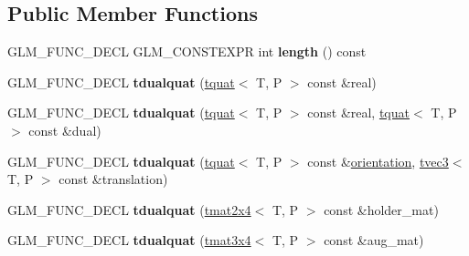 \subsection*{Public Member Functions}
\begin{DoxyCompactItemize}
\item 
\hypertarget{structglm_1_1detail_1_1tdualquat_a002ccdb011d5b6e79f613388e83f3f43}{G\-L\-M\-\_\-\-F\-U\-N\-C\-\_\-\-D\-E\-C\-L G\-L\-M\-\_\-\-C\-O\-N\-S\-T\-E\-X\-P\-R int {\bfseries length} () const }\label{structglm_1_1detail_1_1tdualquat_a002ccdb011d5b6e79f613388e83f3f43}

\item 
\hypertarget{structglm_1_1detail_1_1tdualquat_a4a3b8676710dc0dd69e03b7e5fa2fd46}{G\-L\-M\-\_\-\-F\-U\-N\-C\-\_\-\-D\-E\-C\-L {\bfseries tdualquat} (\hyperlink{structglm_1_1detail_1_1tquat}{tquat}$<$ T, P $>$ const \&real)}\label{structglm_1_1detail_1_1tdualquat_a4a3b8676710dc0dd69e03b7e5fa2fd46}

\item 
\hypertarget{structglm_1_1detail_1_1tdualquat_a3ba0cb0502e788715bd1b28547faaf78}{G\-L\-M\-\_\-\-F\-U\-N\-C\-\_\-\-D\-E\-C\-L {\bfseries tdualquat} (\hyperlink{structglm_1_1detail_1_1tquat}{tquat}$<$ T, P $>$ const \&real, \hyperlink{structglm_1_1detail_1_1tquat}{tquat}$<$ T, P $>$ const \&dual)}\label{structglm_1_1detail_1_1tdualquat_a3ba0cb0502e788715bd1b28547faaf78}

\item 
\hypertarget{structglm_1_1detail_1_1tdualquat_abf6379e6f03b8fd76ae490434893286a}{G\-L\-M\-\_\-\-F\-U\-N\-C\-\_\-\-D\-E\-C\-L {\bfseries tdualquat} (\hyperlink{structglm_1_1detail_1_1tquat}{tquat}$<$ T, P $>$ const \&\hyperlink{group__gtx__rotate__vector_gac80aaf3b2af70c7f03f1077d4b6ac507}{orientation}, \hyperlink{structglm_1_1detail_1_1tvec3}{tvec3}$<$ T, P $>$ const \&translation)}\label{structglm_1_1detail_1_1tdualquat_abf6379e6f03b8fd76ae490434893286a}

\item 
\hypertarget{structglm_1_1detail_1_1tdualquat_a07db5c65293e34b2d0e53c62940db0f8}{G\-L\-M\-\_\-\-F\-U\-N\-C\-\_\-\-D\-E\-C\-L {\bfseries tdualquat} (\hyperlink{structglm_1_1detail_1_1tmat2x4}{tmat2x4}$<$ T, P $>$ const \&holder\-\_\-mat)}\label{structglm_1_1detail_1_1tdualquat_a07db5c65293e34b2d0e53c62940db0f8}

\item 
\hypertarget{structglm_1_1detail_1_1tdualquat_afd1ddf2aeffe1f900dfbc17507860e89}{G\-L\-M\-\_\-\-F\-U\-N\-C\-\_\-\-D\-E\-C\-L {\bfseries tdualquat} (\hyperlink{structglm_1_1detail_1_1tmat3x4}{tmat3x4}$<$ T, P $>$ const \&aug\-\_\-mat)}\label{structglm_1_1detail_1_1tdualquat_afd1ddf2aeffe1f900dfbc17507860e89}


\end{DoxyCompactItemize}
